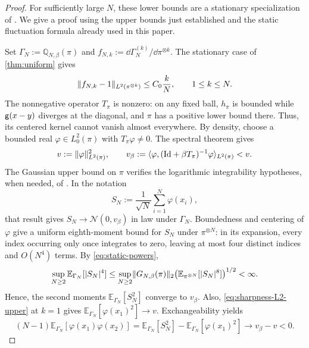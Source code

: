\documentclass[11pt,reqno]{amsart}
\numberwithin{equation}{section}
\theoremstyle{plain}
\theoremstyle{remark}
\DeclarePairedDelimiter{\norm}{\lVert}{\rVert}
\newcommand{\E}{\mathbb E}\newcommand{\Q}{\mathbb Q}\newcommand{\Pb}{\mathbb P}
\newcommand{\Id}{\mathrm{Id}}
\begin{document}
\begin{proof}
For sufficiently large $N$, these lower bounds are a stationary specialization of \cite[Theorem~2.1]{DGRchaos}. We give a proof using the upper bounds just established and the static fluctuation formula already used in this paper.

Set $\Gamma_N:=\Q_{N,\beta}(\pi)$ and $f_{N,k}:=\dd\Gamma_N^{(k)}/\dd\pi^{\otimes k}$. The stationary case of \cref{thm:uniform} gives
\begin{equation}\label{eq:sharpness-L2-upper}
 \norm{f_{N,k}-1}_{L^2(\pi^{\otimes k})}\le C_0\frac{k}{N},\qquad 1\le k\le N.
\end{equation}
The nonnegative operator $T_\pi$ is nonzero: on any fixed ball, $h_\pi$ is bounded while $\mathsf g(x-y)$ diverges at the diagonal, and $\pi$ has a positive lower bound there. Thus, its centered kernel cannot vanish almost everywhere. By density, choose a bounded real $\varphi\in L^2_0(\pi)$ with $T_\pi\varphi\ne0$. The spectral theorem gives
\begin{equation}\label{eq:sharpness-variance-gap}
 v:=\norm{\varphi}_{L^2(\pi)}^2,
 \qquad v_\beta:=\langle\varphi,(\Id+\beta T_\pi)^{-1}\varphi\rangle_{L^2(\pi)}<v.
\end{equation}
The Gaussian upper bound on $\pi$ verifies the logarithmic integrability hypotheses, when needed, of \cite[Proposition~2.11]{DGRpartition}. In the notation
\begin{equation}\label{eq:sharpness-statistic}
 S_N:=\frac1{\sqrt N}\sum_{i=1}^N\varphi(x_i),
\end{equation}
that result gives $S_N\to\mathcal N(0,v_\beta)$ in law under $\Gamma_N$. Boundedness and centering of $\varphi$ give a uniform eighth-moment bound for $S_N$ under $\pi^{\otimes N}$: in its expansion, every index occurring only once integrates to zero, leaving at most four distinct indices and $O(N^4)$ terms. By \eqref{eq:static-powers},
\begin{equation}\label{eq:sharpness-moment-transfer}
 \sup_{N\ge2}\E_{\Gamma_N}[|S_N|^4]
 \le\sup_{N\ge2}\norm{G_{N,\beta}(\pi)}_2
       \bigl(\E_{\pi^{\otimes N}}[|S_N|^8]\bigr)^{1/2}<\infty.
\end{equation}
Hence, the second moments $\E_{\Gamma_N}[S_N^2]$ converge to $v_\beta$. Also, \eqref{eq:sharpness-L2-upper} at $k=1$ gives $\E_{\Gamma_N}[\varphi(x_1)^2]\to v$. Exchangeability yields
\begin{equation}\label{eq:sharpness-pair-covariance}
 (N-1)\E_{\Gamma_N}[\varphi(x_1)\varphi(x_2)]
 =\E_{\Gamma_N}[S_N^2]-\E_{\Gamma_N}[\varphi(x_1)^2]\longrightarrow v_\beta-v<0.

\end{equation}
\end{proof}
\end{document}
